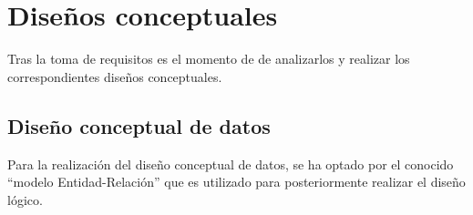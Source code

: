 \documentclass{\ClassPath/viu-tfm-template}
\begin{document}
%
%
%
%
%

%
%
%
%
\chapter{Diseños conceptuales}

Tras la toma de requisitos es el momento de de analizarlos y realizar los correspondientes diseños conceptuales.


\section{Diseño conceptual de datos}

Para la realización del diseño conceptual de datos, se ha optado por el conocido “modelo Entidad-Relación” que es utilizado para posteriormente realizar el diseño lógico.
\end{document}
